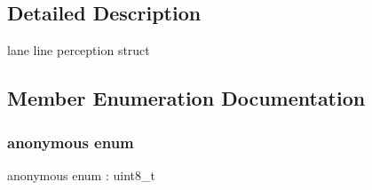 \subsection{Detailed Description}
lane line perception struct 

\subsection{Member Enumeration Documentation}
\mbox{\label{structmaf__perception__interface_1_1LanePerception_a39d090ff9366cf355e5dcf4a2c32f5b7}} 
\subsubsection{\texorpdfstring{anonymous enum}{anonymous enum}}
{\footnotesize\ttfamily anonymous enum \+: uint8\+\_\+t}

